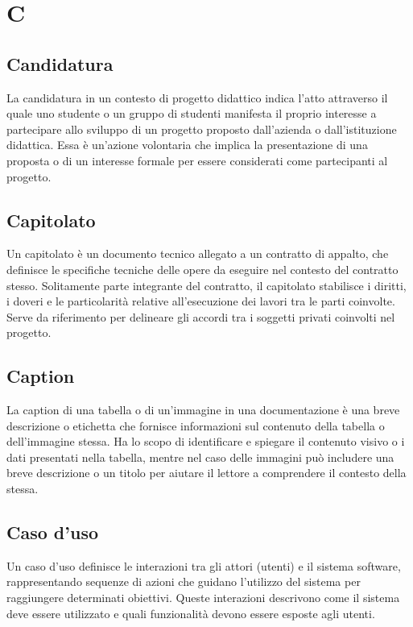 \section*{C} 
\subsection*{Candidatura} 
La candidatura in un contesto di progetto didattico indica l'atto attraverso il quale uno studente o un gruppo di studenti manifesta il proprio interesse a partecipare allo sviluppo di un progetto proposto dall'azienda o dall'istituzione didattica. Essa è un'azione volontaria che implica la presentazione di una proposta o di un interesse formale per essere considerati come partecipanti al progetto.
\subsection*{Capitolato} 
Un capitolato è un documento tecnico allegato a un contratto di appalto, che definisce le specifiche tecniche delle opere da eseguire nel contesto del contratto stesso. Solitamente parte integrante del contratto, il capitolato stabilisce i diritti, i doveri e le particolarità relative all'esecuzione dei lavori tra le parti coinvolte. Serve da riferimento per delineare gli accordi tra i soggetti privati coinvolti nel progetto.
\subsection*{Caption} 
La caption di una tabella o di un'immagine in una documentazione è una breve descrizione o etichetta che fornisce informazioni sul contenuto della tabella o dell'immagine stessa. Ha lo scopo di identificare e spiegare il contenuto visivo o i dati presentati nella tabella, mentre nel caso delle immagini può includere una breve descrizione o un titolo per aiutare il lettore a comprendere il contesto della stessa.
\subsection*{Caso d'uso} 
Un caso d'uso definisce le interazioni tra gli attori (utenti) e il sistema software, rappresentando sequenze di azioni che guidano l'utilizzo del sistema per raggiungere determinati obiettivi. Queste interazioni descrivono come il sistema deve essere utilizzato e quali funzionalità devono essere esposte agli utenti.
